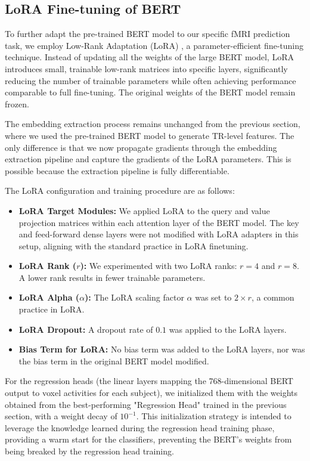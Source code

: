 \documentclass[10pt,letterpaper]{article}
\begin{document}
\subsection{LoRA Fine-tuning of BERT}

To further adapt the pre-trained BERT model to our specific fMRI prediction task, we employ Low-Rank Adaptation (LoRA) \cite{hu2021lora}, a parameter-efficient fine-tuning technique. Instead of updating all the weights of the large BERT model, LoRA introduces small, trainable low-rank matrices into specific layers, significantly reducing the number of trainable parameters while often achieving performance comparable to full fine-tuning. The original weights of the BERT model remain frozen.

The embedding extraction process remains unchanged from the previous section, where we used the pre-trained BERT model to generate TR-level features. The only difference is that we now propagate gradients through the embedding extraction pipeline and capture the gradients of the LoRA parameters. This is possible because the extraction pipeline is fully differentiable.

The LoRA configuration and training procedure are as follows:
\begin{itemize}
    \item \textbf{LoRA Target Modules:} We applied LoRA to the query and value projection matrices within each attention layer of the BERT model. The key and feed-forward dense layers were not modified with LoRA adapters in this setup, aligning with the standard practice in LoRA finetuning.
    \item \textbf{LoRA Rank (\(r\)):} We experimented with two LoRA ranks: \(r=4\) and \(r=8\). A lower rank results in fewer trainable parameters.
    \item \textbf{LoRA Alpha (\(\alpha\)):} The LoRA scaling factor \(\alpha\) was set to \(2 \times r\), a common practice in LoRA.
    \item \textbf{LoRA Dropout:} A dropout rate of \(0.1\) was applied to the LoRA layers.
    \item \textbf{Bias Term for LoRA:} No bias term was added to the LoRA layers, nor was the bias term in the original BERT model modified.
\end{itemize}

For the regression heads (the linear layers mapping the 768-dimensional BERT output to voxel activities for each subject), we initialized them with the weights obtained from the best-performing "Regression Head" trained in the previous section, with a weight decay of \(10^{-1}\). This initialization strategy is intended to leverage the knowledge learned during the regression head training phase, providing a warm start for the classifiers, preventing the BERT's weights from being breaked by the regression head training.
\end{document}
